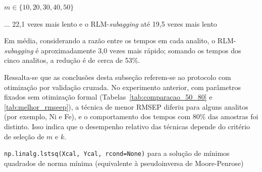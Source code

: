 $m \in \{10, 20, 30, 40, 50\}$


... 22,1 vezes mais lento e o RLM-\textit{subagging} até 19,5 vezes mais lento


Em média, considerando a razão entre os tempos em cada analito, o
RLM-\textit{subagging} é aproximadamente 3,0 vezes mais rápido; somando os
tempos dos cinco analitos, a redução é de cerca de 53\%.


Ressalta-se que as conclusões desta subseção referem-se ao protocolo com
otimização por validação cruzada. No experimento anterior, com parâmetros
fixados sem otimização formal (Tabelas~\ref{tab:comparacao_50_80} e
\ref{tab:melhor_rmseep}), a técnica de menor RMSEP diferiu para alguns
analitos (por exemplo, Ni e Fe), e o comportamento dos tempos com 80\% das
amostras foi distinto. Isso indica que o desempenho relativo das técnicas
depende do critério de seleção de $m$ e $k$.


\texttt{np.linalg.lstsq(Xcal, Ycal, rcond=None)} para a solução de mínimos
quadrados de norma mínima (equivalente à pseudoinversa de Moore-Penrose)
